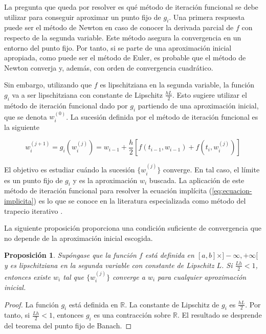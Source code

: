 \documentclass{article}
\theoremstyle{theorem-style}  %
\newtheorem{proposition}[theorem]{Proposición}
\theoremstyle{definition-style}
\theoremstyle{example-style}
\begin{document}
	La pregunta que queda por resolver es qué método de iteración funcional se debe utilizar para conseguir aproximar un punto fijo de $g_i$. Una primera respuesta puede ser el método de Newton en caso de conocer la derivada parcial de $f$ con respecto de la segunda variable. Este método asegura la convergencia en un entorno del punto fijo. Por tanto, si se parte de una aproximación inicial apropiada, como puede ser el método de Euler, es probable que el método de Newton converja y, además, con orden de convergencia cuadrático.

	Sin embargo, utilizando que $f$ es lipschitziana en la segunda variable, la función $g_i$ va a ser lipschitziana con constante de Lipschitz $\frac{hL}{2}$. Esto sugiere utilizar el método de iteración funcional dado por $g_i$ partiendo de una aproximación inicial, que se denota $w_i^{(0)}$. La sucesión definida por el método de iteración funcional es la siguiente

	\begin{equation} \label{eq:ti-def}
		w_{i} ^{(j+1)} = g_i(w_i^{(j)}) = w_{i-1} + \frac{h}{2} \left[f(t_{i-1}, w_{i-1}) + f(t_i, w_{i}^{(j)})\right]
	\end{equation}

	El objetivo es estudiar cuándo la sucesión $\{w_{i}^{(j)}\}$ converge. En tal caso, el límite es un punto fijo de $g_i$ y es la aproximación $w_i$ buscada. La aplicación de este método de iteración funcional para resolver la ecuación implícita (\ref{eq:ecuacion-implicita}) es lo que se conoce en la literatura especializada como método del trapecio iterativo \cite{akitson}.

	La siguiente proposición proporciona una condición suficiente de convergencia que no depende de la aproximación inicial escogida.

	\begin{proposition}
		Supóngase que la función $f$ está definida en $[a,b]\times]-\infty, +\infty[$ y es lipschitziana en la segunda variable con constante de Lipschitz $L$. Si $\frac{Lh}{2} < 1$, entonces existe $w_i$ tal que $\{w_i^{(j)}\}$ converge a $w_i$ para cualquier aproximación inicial.
	\end{proposition}

	\begin{proof}
		La función $g_i$ está definida en $\mathbb{R}$. La constante de Lipschitz de $g_i$ es $\frac{hL}{2}$. Por tanto, si $\frac{Lh}{2} < 1$, entonces $g_i$ es una contracción sobre $\mathbb{R}$. El resultado se desprende del teorema del punto fijo de Banach.
	\end{proof}
\end{document}
